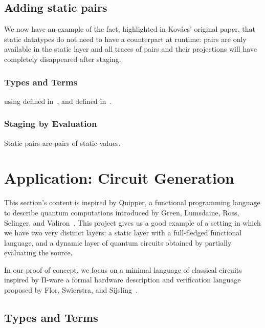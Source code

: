 \documentclass{article}
\begin{document}
\subsection{Adding static pairs}\label{sec:stagingmodelprod}

We now have an example of the fact, highlighted in Kov{\'{a}}cs'
original paper, that static datatypes do not need to have a
counterpart at runtime: pairs are only available in the static
layer and all traces of pairs and their projections will have
completely disappeared after staging.

\subsubsection{Types and Terms}




using  defined in~,
and  defined in~.

\subsubsection{Staging by Evaluation}

Static pairs are pairs of static values.



\section{Application: Circuit Generation}

This section's content is inspired by Quipper, a functional
programming language to describe quantum computations
introduced by Green, Lumsdaine, Ross, Selinger, and
Valiron~\cite{DBLP:conf/rc/GreenLRSV13}.
%
This project gives us a good example of a setting in which
we have two very distinct layers: a static layer with a
full-fledged functional language, and a dynamic layer of
quantum circuits obtained by partially evaluating the source.

In our proof of concept, we focus on a minimal language of
classical circuits inspired by Π-ware a formal hardware
description and verification language proposed by
Flor, Swierstra, and Sijsling~\cite{DBLP:conf/types/FlorSS15}.

\subsection{Types and Terms}
\end{document}
